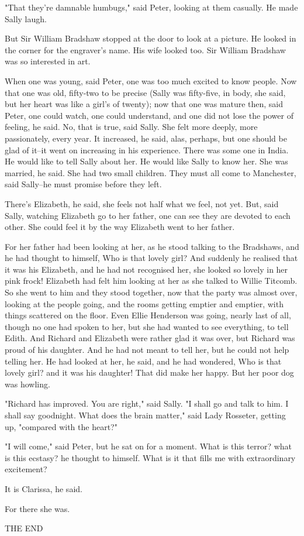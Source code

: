 \documentclass[lang=cn,10pt]{elegantbook}
\begin{document}
"That they're damnable humbugs," said Peter, looking at them
casually.  He made Sally laugh.

But Sir William Bradshaw stopped at the door to look at a picture.
He looked in the corner for the engraver's name.  His wife looked
too.  Sir William Bradshaw was so interested in art.

When one was young, said Peter, one was too much excited to know
people.  Now that one was old, fifty-two to be precise (Sally was
fifty-five, in body, she said, but her heart was like a girl's of
twenty); now that one was mature then, said Peter, one could watch,
one could understand, and one did not lose the power of feeling, he
said.  No, that is true, said Sally.  She felt more deeply, more
passionately, every year.  It increased, he said, alas, perhaps,
but one should be glad of it--it went on increasing in his
experience.  There was some one in India.  He would like to tell
Sally about her.  He would like Sally to know her.  She was
married, he said.  She had two small children.  They must all come
to Manchester, said Sally--he must promise before they left.

There's Elizabeth, he said, she feels not half what we feel, not
yet.  But, said Sally, watching Elizabeth go to her father, one can
see they are devoted to each other.  She could feel it by the way
Elizabeth went to her father.

For her father had been looking at her, as he stood talking to the
Bradshaws, and he had thought to himself, Who is that lovely girl?
And suddenly he realised that it was his Elizabeth, and he had not
recognised her, she looked so lovely in her pink frock!  Elizabeth
had felt him looking at her as she talked to Willie Titcomb.  So
she went to him and they stood together, now that the party was
almost over, looking at the people going, and the rooms getting
emptier and emptier, with things scattered on the floor.  Even
Ellie Henderson was going, nearly last of all, though no one had
spoken to her, but she had wanted to see everything, to tell Edith.
And Richard and Elizabeth were rather glad it was over, but Richard
was proud of his daughter.  And he had not meant to tell her, but
he could not help telling her.  He had looked at her, he said, and
he had wondered, Who is that lovely girl? and it was his daughter!
That did make her happy.  But her poor dog was howling.

"Richard has improved.  You are right," said Sally.  "I shall go
and talk to him.  I shall say goodnight.  What does the brain
matter," said Lady Rosseter, getting up, "compared with the heart?"

"I will come," said Peter, but he sat on for a moment.  What is
this terror? what is this ecstasy? he thought to himself.  What is
it that fills me with extraordinary excitement?

It is Clarissa, he said.

For there she was.

THE END
\end{document}
